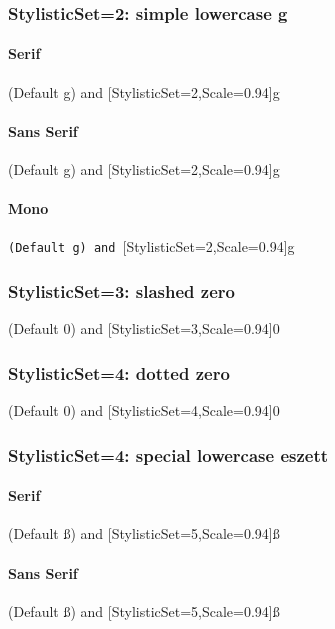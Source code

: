 \documentclass[fontsize=11pt,paper=a4,twoside=on,abstract=on,usegeometry]{scrartcl}
\begin{document}
\subsubsection{StylisticSet=2: simple lowercase g}

\paragraph{Serif}
{(Default g) and [StylisticSet=2,Scale=0.94]g}

\paragraph{Sans Serif}
{\textsf{(Default g) and }[StylisticSet=2,Scale=0.94]g}

\paragraph{Mono}
{\texttt{(Default g) and }[StylisticSet=2,Scale=0.94]g}

\subsubsection{StylisticSet=3: slashed zero}

{(Default 0) and [StylisticSet=3,Scale=0.94]0}

\subsubsection{StylisticSet=4: dotted zero}

{(Default 0) and [StylisticSet=4,Scale=0.94]0}

\subsubsection{StylisticSet=4: special lowercase eszett}

\paragraph{Serif}
{(Default ß) and [StylisticSet=5,Scale=0.94]ß}

\paragraph{Sans Serif}
{\sffamily(Default ß) and [StylisticSet=5,Scale=0.94]ß}
\end{document}
